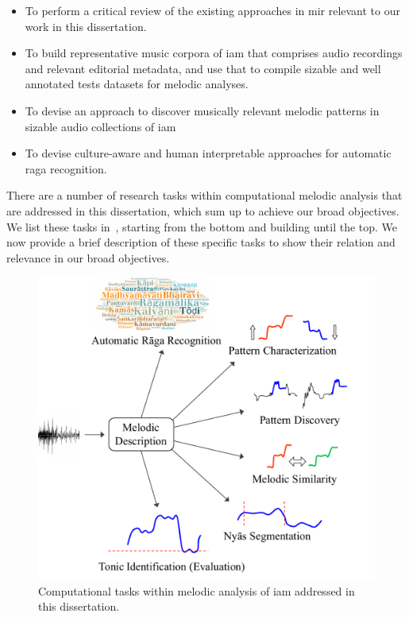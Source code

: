 \begin{itemize}
	\item To perform a critical review of the existing approaches in \gls{mir} relevant to our work in this dissertation.
	\item To build representative music corpora of \gls{iam} that comprises audio recordings and relevant editorial metadata, and use that to compile sizable and well annotated tests datasets for melodic analyses.
	\item To devise an approach to discover musically relevant melodic patterns in sizable audio collections of \gls{iam}
	\item To devise culture-aware and human interpretable approaches for automatic \gls{raga} recognition.
\end{itemize}


There are a number of research tasks within computational melodic analysis that are addressed in this dissertation, which sum up to achieve our broad objectives. We list these tasks in~, starting from the bottom and building until the top. We now provide a brief description of these specific tasks to show their relation and relevance in our broad objectives. 

\begin{figure}[h]
	\begin{center}
		\includegraphics[width=\figSizeHundred]{ch01_introduction/figures/tasks.pdf}
	\end{center}
	\caption{Computational tasks within melodic analysis of \gls{iam} addressed in this dissertation.}
	\label{fig:tasks}
\end{figure}

